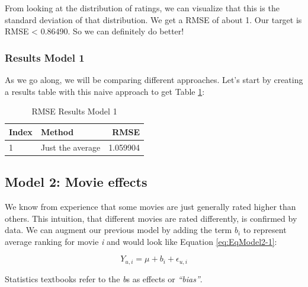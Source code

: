 \documentclass[
]{article}
\begin{document}
From looking at the distribution of ratings, we can visualize that this
is the standard deviation of that distribution. We get a RMSE of about
1. Our target is RMSE \textless{} 0.86490. So we can definitely do
better!

\newpage

\hypertarget{results-model-1}{%
\subsubsection{Results Model 1}\label{results-model-1}}

As we go along, we will be comparing different approaches. Let's start
by creating a results table with this naive approach to get Table
\ref{tbl:rmse_results_model_1}:

\begin{table}[H]

\caption{\label{tab:m_1_4}RMSE Results Model 1\label{tbl:rmse_results_model_1}}
\centering
\fontsize{7}{9}\selectfont
\begin{tabular}[t]{llr}
\toprule
Index & Method & RMSE\\
\midrule
1 & Just the average & 1.059904\\
\bottomrule
\end{tabular}
\end{table}

\newpage

\hypertarget{model-2-movie-effects}{%
\subsection{Model 2: Movie effects}\label{model-2-movie-effects}}

We know from experience that some movies are just generally rated higher
than others. This intuition, that different movies are rated
differently, is confirmed by data. We can augment our previous model by
adding the term \(b_{i}\) to represent average ranking for movie
\emph{i} and would look like Equation \ref{eq:EqModel2-1}:

%
\par

\label{eq:EqModel2-1} \begin{equation}
  Y_{u,i} = \mu + b_{i} + \epsilon_{u,i}
\end{equation}

Statistics textbooks refer to the \emph{b}s as effects or
\emph{``bias''}.
\end{document}
